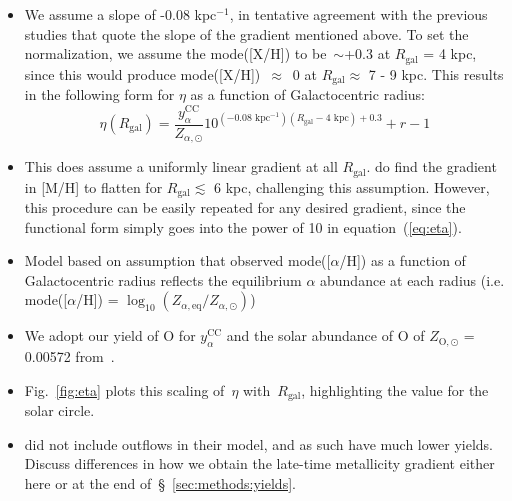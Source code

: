 \documentclass[a4paper, fleqn, usenatbib, useAMS]{mnras}
\newcommand{\refp}[1]{(\ref{#1})}
\begin{document}
\begin{itemize}
	\item We assume a slope of -0.08 kpc$^{-1}$, in tentative agreement with 
	the previous studies that quote the slope of the gradient mentioned above. 
	To set the normalization, we assume the mode([X/H]) to be~$\sim$+0.3 at 
	$R_\text{gal}$ = 4 kpc, since this would produce mode([X/H])~$\approx$~0 at 
	$R_\text{gal}\approx$ 7 - 9 kpc. This results in the following form for 
	$\eta$ as a function of Galactocentric radius: 
	\begin{equation} 
	\eta(R_\text{gal}) = \frac{y_\alpha^\text{CC}}{Z_{\alpha,\odot}} 
	10^{(-0.08\text{ kpc}^{-1})(R_\text{gal} - \text{4 kpc}) + 0.3} + r - 1 
	\label{eq:eta} 
	\end{equation} 

	\item This does assume a uniformly linear gradient at all $R_\text{gal}$. 
	\citet{Hayden2014} do find the gradient in [M/H] to flatten for 
	$R_\text{gal}\lesssim$ 6 kpc, challenging this assumption. However, this 
	procedure can be easily repeated for any desired gradient, since the 
	functional form simply goes into the power of 10 in equation~\refp{eq:eta}. 

	\item Model based on assumption that observed mode([$\alpha$/H]) as a 
	function of Galactocentric radius reflects the equilibrium $\alpha$ 
	abundance at each radius (i.e. mode([$\alpha$/H]) = 
	$\log_{10}(Z_{\alpha,\text{eq}}/Z_{\alpha,\odot})$)

	\item We adopt our yield of O for $y_\alpha^\text{CC}$ and the solar 
	abundance of O of $Z_{\text{O},\odot}$ = 0.00572 from~\citet{Asplund2009}. 

	\item Fig.~\ref{fig:eta} plots this scaling of~$\eta$ with~$R_\text{gal}$, 
	highlighting the value for the solar circle. 

	\item \citet{Minchev2013} did not include outflows in their model, and as 
	such have much lower yields. Discuss differences in how we obtain the 
	late-time metallicity gradient either here or at the end 
	of~\S~\ref{sec:methods:yields}. 
\end{itemize} 
\end{document}
